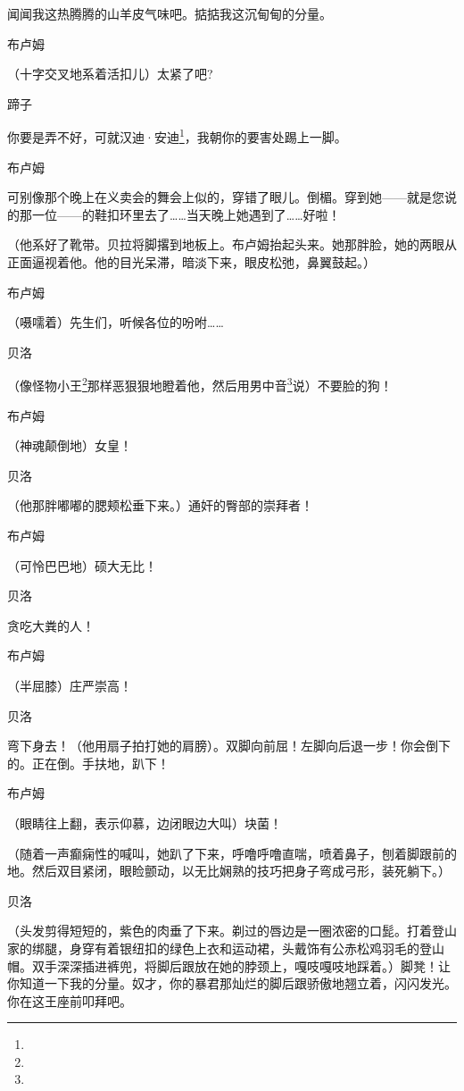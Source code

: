 \par 闻闻我这热腾腾的山羊皮气味吧。掂掂我这沉甸甸的分量。
\par 布卢姆
\par （十字交叉地系着活扣儿）太紧了吧?
\par 蹄子
\par 你要是弄不好，可就汉迪·安迪\footnote{}，我朝你的要害处踢上一脚。
\par 布卢姆
\par 可别像那个晚上在义卖会的舞会上似的，穿错了眼儿。倒楣。穿到她——就是您说的那一位——的鞋扣环里去了……当天晚上她遇到了……好啦！
\par （他系好了靴带。贝拉将脚撂到地板上。布卢姆抬起头来。她那胖脸，她的两眼从正面逼视着他。他的目光呆滞，暗淡下来，眼皮松弛，鼻翼鼓起。）
\par 布卢姆
\par （嗫嚅着）先生们，听候各位的吩咐……
\par 贝洛
\par （像怪物小王\footnote{}那样恶狠狠地瞪着他，然后用男中音\footnote{}说）不要脸的狗！
\par 布卢姆
\par （神魂颠倒地）女皇！
\par 贝洛
\par （他那胖嘟嘟的腮颊松垂下来。）通奸的臀部的崇拜者！
\par 布卢姆
\par （可怜巴巴地）硕大无比！
\par 贝洛
\par 贪吃大粪的人！
\par 布卢姆
\par （半屈膝）庄严崇高！
\par 贝洛
\par 弯下身去！（他用扇子拍打她的肩膀）。双脚向前屈！左脚向后退一步！你会倒下的。正在倒。手扶地，趴下！
\par 布卢姆
\par （眼睛往上翻，表示仰慕，边闭眼边大叫）块菌！
\par （随着一声癫痫性的喊叫，她趴了下来，呼噜呼噜直喘，喷着鼻子，刨着脚跟前的地。然后双目紧闭，眼睑颤动，以无比娴熟的技巧把身子弯成弓形，装死躺下。）
\par 贝洛
\par （头发剪得短短的，紫色的肉垂了下来。剃过的唇边是一圈浓密的口髭。打着登山家的绑腿，身穿有着银纽扣的绿色上衣和运动裙，头戴饰有公赤松鸡羽毛的登山帽。双手深深插进裤兜，将脚后跟放在她的脖颈上，嘎吱嘎吱地踩着。）脚凳！让你知道一下我的分量。奴才，你的暴君那灿烂的脚后跟骄傲地翘立着，闪闪发光。你在这王座前叩拜吧。
